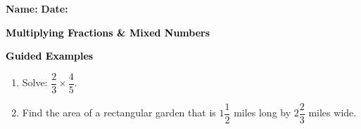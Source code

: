 \documentclass[12pt, letterpaper, fleqn]{article}
\begin{document}
\textbf{Name:} \underline{\hspace{5cm}}
\hfill
\textbf{Date:} \underline{\hspace{3cm}}\\

\begin{tcolorbox}[colback=customteal!20]
    \large\textcolor{black}{\textbf{Multiplying Fractions \& Mixed Numbers}}
\end{tcolorbox}
\newpage
\begin{tcolorbox}[colback=customteal!20]
    \large\textcolor{black}{\textbf{Guided Examples}}
\end{tcolorbox}
\begin{enumerate}[itemsep=3.5cm, leftmargin=0.6cm]
\item Solve: $\dfrac{2}{3} \times \dfrac{4}{5}$.
\vspace{3cm}
\item Find the area of a rectangular garden that is $1\dfrac{1}{2}$ miles long by $2\dfrac{2}{3}$ miles wide.
\end{enumerate}
\end{document}
